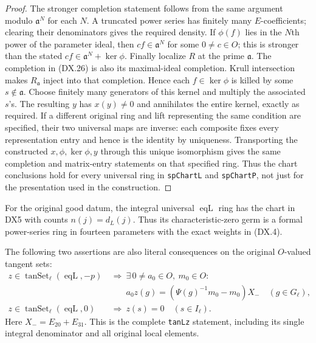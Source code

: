 \begin{proof}
The stronger completion statement follows from the same
argument modulo $\mathfrak a^N$ for each $N$.
A truncated power series has finitely many $E$-coefficients;
clearing their denominators gives the required density.
If $\phi(f)$ lies in the $N$th power of the parameter ideal,
then $cf\in\mathfrak a^N$ for some $0\ne c\in O$;
this is stronger than the stated
$cf\in\mathfrak a^N+\ker\phi$.
Finally localize $R$ at the prime $\mathfrak a$.
The completion in (DX.26) is also its maximal-ideal completion.
Krull intersection makes $R_{\mathfrak a}$ inject into that
completion.  Hence each $f\in\ker\phi$ is killed by some
$s\notin\mathfrak a$.  Choose finitely many generators of
this kernel and multiply the associated $s$'s.
The resulting $y$ has $x(y)\ne0$ and annihilates the entire
kernel, exactly as required.
If a different original ring and lift representing the same
condition are specified, their two universal maps are inverse:
each composite fixes every representation entry and hence
is the identity by uniqueness.  Transporting the constructed
$x,\phi,\ker\phi,y$ through this unique isomorphism gives
the same completion and matrix-entry statements on that
specified ring.  Thus the chart conclusions hold for every
universal ring in \texttt{spChartL} and \texttt{spChartP},
not just for the presentation used in the construction.
\end{proof}

\begin{proposition}
\label{claim:DX6}
For the original good datum, the integral universal
$\operatorname{eqL}$ ring has the chart in DX5 with counts
$n(j)=d_L(j)$.  Thus its characteristic-zero germ is a formal
power-series ring in fourteen parameters with the exact weights
in (DX.4).

The following two assertions are also literal consequences
on the original $O$-valued tangent sets:
\[
\begin{aligned}
 z\in\operatorname{tanSet}_\ell(\operatorname{eqL},-p)
 &\ \Longrightarrow\
 \exists\,0\ne a_0\in O,\ m_0\in O:\\
 &\qquad a_0z(g)=(\Psi(g)^{-1}m_0-m_0)X_-
                        \quad(g\in G_\ell),\\
 z\in\operatorname{tanSet}_\ell(\operatorname{eqL},0)
 &\ \Longrightarrow\ z(s)=0\quad(s\in I_\ell).
\end{aligned}
 \tag{DX.29}
\]
Here $X_-=E_{20}+E_{31}$.
This is the complete \texttt{tanLz} statement, including its
single integral denominator and all original local elements.
\end{proposition}


